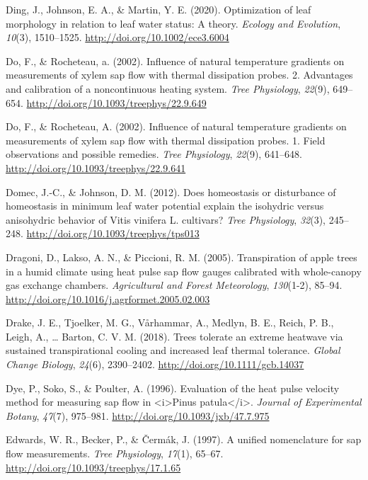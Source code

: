 \documentclass[11pt,twoside]{reedthesis}
\begin{document}
\hypertarget{ref-ding_optimization_2020}{}
Ding, J., Johnson, E. A., \& Martin, Y. E. (2020). Optimization of leaf
morphology in relation to leaf water status: A theory. \emph{Ecology and
Evolution}, \emph{10}(3), 1510--1525.
\url{http://doi.org/10.1002/ece3.6004}

\hypertarget{ref-Do2002}{}
Do, F., \& Rocheteau, a. (2002). Influence of natural temperature
gradients on measurements of xylem sap flow with thermal dissipation
probes. 2. Advantages and calibration of a noncontinuous heating system.
\emph{Tree Physiology}, \emph{22}(9), 649--654.
\url{http://doi.org/10.1093/treephys/22.9.649}

\hypertarget{ref-Do2002b}{}
Do, F., \& Rocheteau, A. (2002). Influence of natural temperature
gradients on measurements of xylem sap flow with thermal dissipation
probes. 1. Field observations and possible remedies. \emph{Tree
Physiology}, \emph{22}(9), 641--648.
\url{http://doi.org/10.1093/treephys/22.9.641}

\hypertarget{ref-domec_does_2012}{}
Domec, J.-C., \& Johnson, D. M. (2012). Does homeostasis or disturbance
of homeostasis in minimum leaf water potential explain the isohydric
versus anisohydric behavior of Vitis vinifera L. cultivars? \emph{Tree
Physiology}, \emph{32}(3), 245--248.
\url{http://doi.org/10.1093/treephys/tps013}

\hypertarget{ref-Dragoni2005}{}
Dragoni, D., Lakso, A. N., \& Piccioni, R. M. (2005). Transpiration of
apple trees in a humid climate using heat pulse sap flow gauges
calibrated with whole-canopy gas exchange chambers. \emph{Agricultural
and Forest Meteorology}, \emph{130}(1-2), 85--94.
\url{http://doi.org/10.1016/j.agrformet.2005.02.003}

\hypertarget{ref-drake_trees_2018}{}
Drake, J. E., Tjoelker, M. G., Vårhammar, A., Medlyn, B. E., Reich, P.
B., Leigh, A., \ldots{} Barton, C. V. M. (2018). Trees tolerate an
extreme heatwave via sustained transpirational cooling and increased
leaf thermal tolerance. \emph{Global Change Biology}, \emph{24}(6),
2390--2402. \url{http://doi.org/10.1111/gcb.14037}

\hypertarget{ref-Dye1996}{}
Dye, P., Soko, S., \& Poulter, A. (1996). Evaluation of the heat pulse
velocity method for measuring sap flow in
\textless{}i\textgreater{}Pinus patula\textless{}/i\textgreater{}.
\emph{Journal of Experimental Botany}, \emph{47}(7), 975--981.
\url{http://doi.org/10.1093/jxb/47.7.975}

\hypertarget{ref-Edwards1997}{}
Edwards, W. R., Becker, P., \& Čermák, J. (1997). A unified nomenclature
for sap flow measurements. \emph{Tree Physiology}, \emph{17}(1), 65--67.
\url{http://doi.org/10.1093/treephys/17.1.65}
\end{document}
